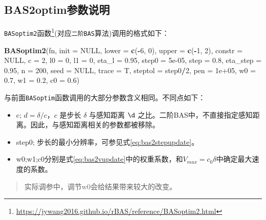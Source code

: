\documentclass[]{ctexbook}
\newenvironment{Shaded}{\begin{snugshade}}{\end{snugshade}}
\newcommand{\KeywordTok}[1]{\textcolor[rgb]{0.13,0.29,0.53}{\textbf{#1}}}
\newcommand{\DataTypeTok}[1]{\textcolor[rgb]{0.13,0.29,0.53}{#1}}
\newcommand{\DecValTok}[1]{\textcolor[rgb]{0.00,0.00,0.81}{#1}}
\newcommand{\FloatTok}[1]{\textcolor[rgb]{0.00,0.00,0.81}{#1}}
\newcommand{\OtherTok}[1]{\textcolor[rgb]{0.56,0.35,0.01}{#1}}
\newcommand{\OperatorTok}[1]{\textcolor[rgb]{0.81,0.36,0.00}{\textbf{#1}}}
\newcommand{\NormalTok}[1]{#1}
\providecommand{\tightlist}{%
  \setlength{\itemsep}{0pt}\setlength{\parskip}{0pt}}
\renewcommand{\href}[2]{#2\footnote{\url{#1}}}
\theoremstyle{definition}
\theoremstyle{definition}
\theoremstyle{definition}
\theoremstyle{remark}
\begin{document}
\subsection{BAS2optim参数说明}\label{BAS2parms}

\href{https://jywang2016.github.io/rBAS/reference/BASoptim2.html}{\texttt{BASoptim2}函数}(对应\texttt{二阶BAS}算法)调用的格式如下：

\begin{Shaded}
\begin{Highlighting}[]
\KeywordTok{BASoptim2}\NormalTok{(fn, }\DataTypeTok{init =} \OtherTok{NULL}\NormalTok{, }\DataTypeTok{lower =} \KeywordTok{c}\NormalTok{(}\OperatorTok{-}\DecValTok{6}\NormalTok{, }\DecValTok{0}\NormalTok{), }\DataTypeTok{upper =} \KeywordTok{c}\NormalTok{(}\OperatorTok{-}\DecValTok{1}\NormalTok{, }\DecValTok{2}\NormalTok{),}
          \DataTypeTok{constr =} \OtherTok{NULL}\NormalTok{, }\DataTypeTok{c =} \DecValTok{2}\NormalTok{, }\DataTypeTok{l0 =} \DecValTok{0}\NormalTok{, }\DataTypeTok{l1 =} \DecValTok{0}\NormalTok{, }\DataTypeTok{eta_l =} \FloatTok{0.95}\NormalTok{,}
          \DataTypeTok{step0 =} \FloatTok{5e-05}\NormalTok{, }\DataTypeTok{step =} \FloatTok{0.8}\NormalTok{, }\DataTypeTok{eta_step =} \FloatTok{0.95}\NormalTok{, }\DataTypeTok{n =} \DecValTok{200}\NormalTok{,}
          \DataTypeTok{seed =} \OtherTok{NULL}\NormalTok{, }\DataTypeTok{trace =}\NormalTok{ T, }\DataTypeTok{steptol =}\NormalTok{ step0}\OperatorTok{/}\DecValTok{2}\NormalTok{, }\DataTypeTok{pen =} \FloatTok{1e+05}\NormalTok{,}
          \DataTypeTok{w0 =} \FloatTok{0.7}\NormalTok{, }\DataTypeTok{w1 =} \FloatTok{0.2}\NormalTok{, }\DataTypeTok{c0 =} \FloatTok{0.6}\NormalTok{)}
\end{Highlighting}
\end{Shaded}

与前面\texttt{BASoptim}函数调用的大部分参数含义相同。不同点如下：

\begin{itemize}
\tightlist
\item
  c; \(d = \delta/c\)，\(c\) 是步长 \(\delta\) 与感知距离 \(\d\)
  之比。二阶BAS中，不直接指定感知距离。因此，与感知距离相关的参数都被移除。
\item
  step0; 步长的最小分辨率，可参见式\eqref{eq:bas2stepupdate}。
\item
  w0;w1;c0分别是式\eqref{eq:bas2vupdate}中的权重系数，和\(V_{max} = c_0 \delta\)中确定最大速度的系数。
\end{itemize}

\begin{quote}
实际调参中，调节w0会给结果带来较大的改变。
\end{quote}
\end{document}
